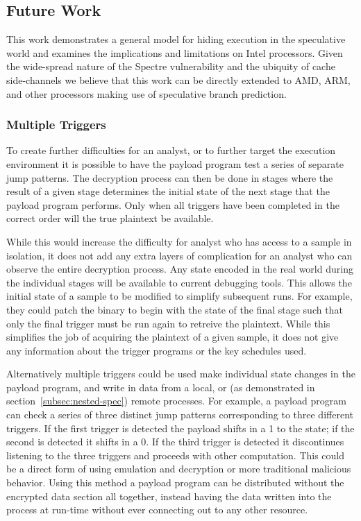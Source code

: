 \subsection{Future Work}
\label{subsec:future-work}

This work demonstrates a general model for hiding execution in 
the speculative world and examines the implications and limitations on 
Intel processors. Given the wide-spread nature of the Spectre vulnerability 
and the ubiquity of cache side-channels we believe that this work can 
be directly extended to AMD, ARM, and other processors making use of
speculative branch prediction.

\subsubsection{Multiple Triggers}
To create further difficulties for an analyst, or to further target
the execution environment it is possible
to have the payload program test a series of separate jump patterns. The decryption
process can then be done in stages where the result of a given stage determines 
the initial state of the next stage that the payload program 
performs. Only when all triggers have been completed in the correct order will
the true plaintext be available. 

While this would increase the difficulty for analyst  who has access
to a sample in isolation, it  does not add any extra layers of complication 
for an analyst who can observe the entire decryption process. Any state 
encoded in the real world during the individual stages will be available to current 
debugging tools. This allows the initial state of a sample to be modified
to simplify subsequent runs. For example, they could patch the 
binary to begin with the state of the final stage such that only the final 
trigger must be run again to retreive the plaintext. While this simplifies the 
job of acquiring the plaintext of a given \speculake sample, it does not give any 
information about the trigger programs or the key schedules used. 

\smallskip

Alternatively multiple triggers could be used make individual state changes in
the payload program, and write in data from a local, or (as demonstrated in 
section~\ref{subsec:nested-spec}) remote processes. For example, a payload program
can check a series of three distinct jump patterns corresponding to three different 
triggers. If the first trigger is detected the payload shifts in a 1 to the state; if
the second is detected it shifts in a 0. If the third trigger is detected it 
discontinues listening to the three triggers and proceeds with other computation. 
This could be a direct form of \speculake using emulation and decryption 
or more traditional malicious behavior. Using this method a payload program can
be distributed without the encrypted data section all together, instead having 
the data written into the process at run-time without ever connecting out to any 
other resource. 

